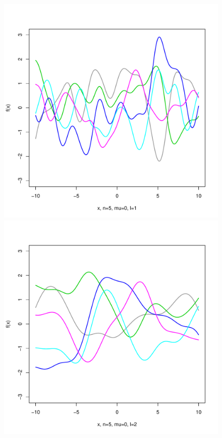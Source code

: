 \documentclass[12pt,letterpaper]{article}
\begin{document}
\begin{figure}
\begin{center}
\includegraphics[scale=0.2]{hw321/n5-m0-l1.pdf}
\includegraphics[scale=0.2]{hw321/n5-m0-l2.pdf}

\end{center}
\end{figure}
\end{document}

